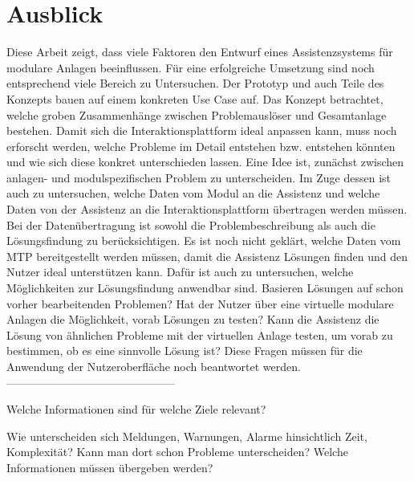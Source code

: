 \section*{Ausblick}
Diese Arbeit zeigt, dass viele Faktoren den Entwurf eines Assistenzsystems für modulare Anlagen beeinflussen. Für eine erfolgreiche Umsetzung sind noch entsprechend viele Bereich zu Untersuchen. Der Prototyp und auch Teile des Konzepts bauen auf einem konkreten Use Case auf. Das Konzept betrachtet, welche groben Zusammenhänge zwischen Problemauslöser und Gesamtanlage bestehen. Damit sich die Interaktionsplattform ideal anpassen kann, muss noch erforscht werden, welche Probleme im Detail entstehen bzw. entstehen könnten und wie sich diese konkret unterschieden lassen. Eine Idee ist, zunächst zwischen anlagen- und modulspezifischen Problem zu unterscheiden. Im Zuge dessen ist auch zu untersuchen, welche Daten vom Modul an die Assistenz und welche Daten von der Assistenz an die Interaktionsplattform übertragen werden müssen. Bei der Datenübertragung ist sowohl die Problembeschreibung als auch die Lösungsfindung zu berücksichtigen. Es ist noch nicht geklärt, welche Daten vom MTP bereitgestellt werden müssen, damit die Assistenz Lösungen finden und den Nutzer ideal unterstützen kann. Dafür ist auch zu untersuchen, welche Möglichkeiten zur Lösungsfindung anwendbar sind. Basieren Lösungen auf schon vorher bearbeitenden Problemen? Hat der Nutzer über eine virtuelle modulare Anlagen die Möglichkeit, vorab Lösungen zu testen? Kann die Assistenz die Lösung von ähnlichen Probleme mit der virtuellen Anlage testen, um vorab zu bestimmen, ob es eine sinnvolle Lösung ist? Diese Fragen müssen für die Anwendung der Nutzeroberfläche noch beantwortet werden.
---------------------------------------------

Welche Informationen sind für welche Ziele relevant?

Wie unterscheiden sich Meldungen, Warnungen, Alarme hinsichtlich Zeit, Komplexität? Kann man dort schon Probleme unterscheiden? Welche Informationen müssen übergeben werden?


